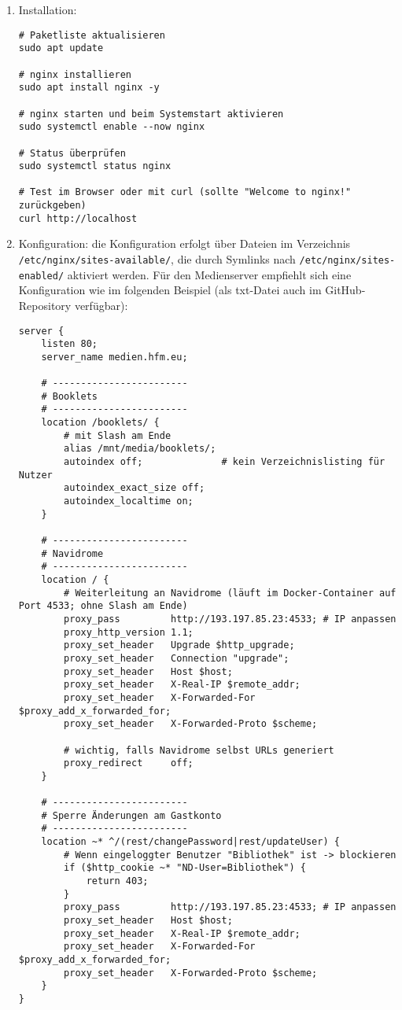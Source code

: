 \documentclass[12pt,a4paper]{report}
\begin{document}
  \begin{enumerate}
    \item Installation:
    \begin{verbatim}
# Paketliste aktualisieren
sudo apt update

# nginx installieren
sudo apt install nginx -y

# nginx starten und beim Systemstart aktivieren
sudo systemctl enable --now nginx

# Status überprüfen
sudo systemctl status nginx

# Test im Browser oder mit curl (sollte "Welcome to nginx!" zurückgeben)
curl http://localhost
    \end{verbatim} 

    \item Konfiguration:
    die Konfiguration erfolgt über Dateien im Verzeichnis \texttt{/etc/nginx/sites-available/}, 
    die durch Symlinks nach \texttt{/etc/nginx/sites-enabled/} aktiviert werden.  
    Für den Medienserver empfiehlt sich eine Konfiguration wie im folgenden Beispiel (als txt-Datei auch im     GitHub-Repository verfügbar):  

    \begin{verbatim}
server {
    listen 80;
    server_name medien.hfm.eu;

    # ------------------------
    # Booklets
    # ------------------------
    location /booklets/ {
        # mit Slash am Ende
        alias /mnt/media/booklets/;
        autoindex off;              # kein Verzeichnislisting für Nutzer
        autoindex_exact_size off;
        autoindex_localtime on;
    }

    # ------------------------
    # Navidrome
    # ------------------------
    location / {
        # Weiterleitung an Navidrome (läuft im Docker-Container auf Port 4533; ohne Slash am Ende)
        proxy_pass         http://193.197.85.23:4533; # IP anpassen
        proxy_http_version 1.1;
        proxy_set_header   Upgrade $http_upgrade;
        proxy_set_header   Connection "upgrade";
        proxy_set_header   Host $host;
        proxy_set_header   X-Real-IP $remote_addr;
        proxy_set_header   X-Forwarded-For $proxy_add_x_forwarded_for;
        proxy_set_header   X-Forwarded-Proto $scheme;

        # wichtig, falls Navidrome selbst URLs generiert
        proxy_redirect     off;
    }

    # ------------------------
    # Sperre Änderungen am Gastkonto
    # ------------------------
    location ~* ^/(rest/changePassword|rest/updateUser) {
        # Wenn eingeloggter Benutzer "Bibliothek" ist -> blockieren
        if ($http_cookie ~* "ND-User=Bibliothek") {
            return 403;
        }
        proxy_pass         http://193.197.85.23:4533; # IP anpassen
        proxy_set_header   Host $host;
        proxy_set_header   X-Real-IP $remote_addr;
        proxy_set_header   X-Forwarded-For $proxy_add_x_forwarded_for;
        proxy_set_header   X-Forwarded-Proto $scheme;
    }
}
    \end{verbatim}  


\end{enumerate}
\end{document}
